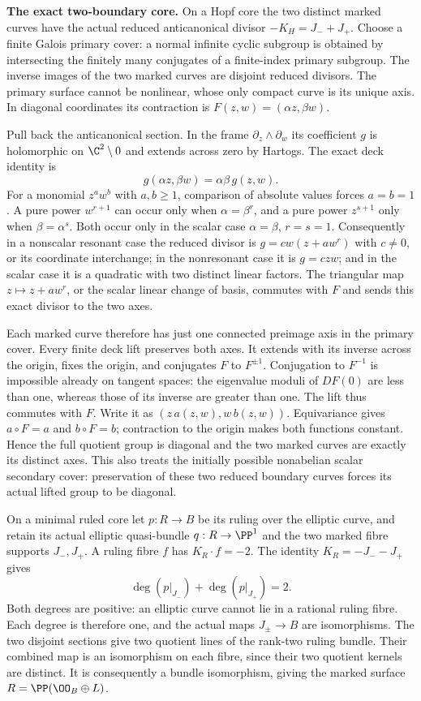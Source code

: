 \par\medskip\noindent\textbf{The exact two-boundary core.}
On a Hopf core the two distinct marked curves have the actual
reduced anticanonical divisor
$-K_H=J_-+J_+$. Choose a finite Galois primary cover:
a normal infinite cyclic subgroup is obtained by intersecting
the finitely many conjugates of a finite-index primary subgroup.
The inverse images of the two marked curves are disjoint reduced
divisors. The primary surface cannot be nonlinear, whose only
compact curve is its unique axis. In diagonal coordinates its
contraction is $F(z,w)=(\alpha z,\beta w)$.

Pull back the anticanonical section. In the frame
$\partial_z\wedge\partial_w$ its coefficient $g$ is holomorphic
on $\C^2\setminus0$ and extends across zero by Hartogs. The exact
deck identity is
\[
                    g(\alpha z,\beta w)=\alpha\beta\,g(z,w).
\]
For a monomial $z^a w^b$ with $a,b\geq1$, comparison of
absolute values forces $a=b=1$. A pure power $w^{r+1}$ can
occur only when $\alpha=\beta^r$, and a pure power $z^{s+1}$
only when $\beta=\alpha^s$. Both occur only in the scalar
case $\alpha=\beta$, $r=s=1$. Consequently in a nonscalar
resonant case the reduced divisor is
$g=cw(z+aw^r)$ with $c\ne0$, or its coordinate interchange;
in the nonresonant case it is $g=czw$; and in the scalar
case it is a quadratic with two distinct linear factors.
The triangular map $z\mapsto z+aw^r$, or the scalar linear
change of basis, commutes with $F$ and sends this exact
divisor to the two axes.

Each marked curve therefore has just one connected preimage
axis in the primary cover. Every finite deck lift preserves
both axes. It extends with its inverse across the origin,
fixes the origin, and conjugates $F$ to $F^{\pm1}$.
Conjugation to $F^{-1}$ is impossible already on tangent
spaces: the eigenvalue moduli of $DF(0)$ are less than one,
whereas those of its inverse are greater than one.
The lift thus commutes with $F$. Write it as
$(z\,a(z,w),w\,b(z,w))$. Equivariance gives
$a\circ F=a$ and $b\circ F=b$; contraction to the origin
makes both functions constant. Hence the full quotient
group is diagonal and the two marked curves are exactly
its distinct axes. This also treats the initially possible
nonabelian scalar secondary cover: preservation of these
two reduced boundary curves forces its actual lifted group
to be diagonal.

On a minimal ruled core let $p:R\to B$ be its ruling over
the elliptic curve, and retain its actual elliptic
quasi-bundle $q:R\to\PP^1$ and the two marked fibre supports
$J_-,J_+$. A ruling fibre $f$ has $K_R\cdot f=-2$.
The identity $K_R=-J_--J_+$ gives
\[
                 \deg(p|_{J_-})+\deg(p|_{J_+})=2.
\]
Both degrees are positive: an elliptic curve cannot lie
in a rational ruling fibre. Each degree is therefore one,
and the actual maps $J_\pm\to B$ are isomorphisms.
The two disjoint sections give two quotient lines of the
rank-two ruling bundle. Their combined map is an
isomorphism on each fibre, since their two quotient
kernels are distinct. It is consequently a bundle
isomorphism, giving the marked surface
$R=\PP(\OO_B\oplus L)$.

